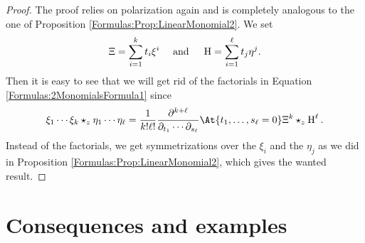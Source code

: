 \begin{proof}
	The proof relies on polarization again and is completely analogous 
	to the one of Proposition \ref{Formulas:Prop:LinearMonomial2}. We set
	\begin{equation*}
		\Xi
		=
		\sum\limits_{i=1}^k t_i \xi^i
		\quad \text{ and } \quad
		\operatorname{H}
		=
		\sum\limits_{i=1}^{\ell} t_j \eta^j
		.
	\end{equation*}
	Then it is easy to see that we will get rid of the factorials in Equation 
	\eqref{Formulas:2MonomialsFormula1} since
	\begin{equation*}
		\xi_1 \cdots \xi_k \star_z \eta_1 \cdots \eta_{\ell}
		=
		\frac{1}{k! \ell!}
		\frac{\partial^{k + \ell}}
		{\partial_{t_1} \cdots \partial_{s_{\ell}}}
		\At{t_1, \ldots, s_{\ell} = 0}
		\Xi^k \star_z \Eta^{\ell}.
	\end{equation*}
	Instead of the factorials, we get symmetrizations over the 
	$\xi_i$ and the $\eta_j$ as we did in Proposition 
	\ref{Formulas:Prop:LinearMonomial2}, which gives the wanted result.
\end{proof}



\section{Consequences and examples}
\label{sec:chap4_Consequences}


